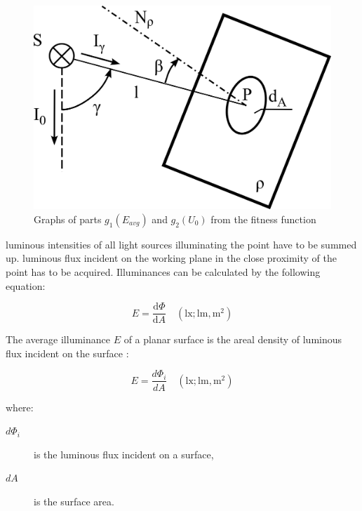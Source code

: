 \begin{figure}[htb] \label{fig:osv}
  \centering
  \includegraphics[width=\columnwidth]{315_osvetlenost_bodovym_zdrojem}
  \caption{Graphs of parts $g_1\left(E_{avg}\right)$ and $g_2\left(U_0\right)$ from the fitness function}
\end{figure}


 luminous intensities of all light sources illuminating the point have to be summed up.
luminous flux incident on the working plane in the close proximity of the point has to be acquired. Illuminances can be calculated by the following equation:

\begin{equation}
E=\frac{\mathrm{d}\Phi}{\mathrm{d}A} \quad \mathrm{(lx;lm,m^{2})}
\end{equation}





The average illuminance $E$ of a planar surface is the areal density of luminous flux incident on the surface \cite{Habel}:

\begin{equation} \label{eq:illuminance}
E=\frac{d\Phi_{i}}{dA} \quad \mathrm{(lx;lm,m^2)}
\end{equation}

where:
\begin{description}
	\item[$d\Phi_{i}$] is the luminous flux incident on a surface,
	\item[$dA$] is the surface area.
\end{description}

